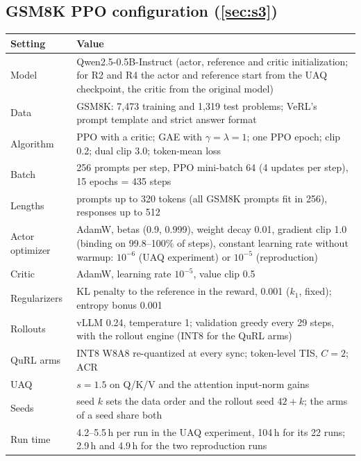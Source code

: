 \subsection{GSM8K PPO configuration (\texorpdfstring{\cref{sec:s3}}{Section 6.3})}
\begin{center}\small
\begin{tabularx}{\linewidth}{@{}l L@{}}
\toprule
Setting & Value\\
\midrule
Model & Qwen2.5-0.5B-Instruct (actor, reference and critic initialization; for R2 and R4 the actor and reference start from the UAQ checkpoint, the critic from the original model)\\
Data & GSM8K: 7{,}473 training and 1{,}319 test problems; VeRL's prompt template and strict answer format\\
Algorithm & PPO with a critic; GAE with $\gamma=\lambda=1$; one PPO epoch; clip 0.2; dual clip 3.0; token-mean loss\\
Batch & 256 prompts per step, PPO mini-batch 64 (4 updates per step), 15 epochs = 435 steps\\
Lengths & prompts up to 320 tokens (all GSM8K prompts fit in 256), responses up to 512\\
Actor optimizer & AdamW, betas (0.9, 0.999), weight decay 0.01, gradient clip 1.0 (binding on 99.8--100\% of steps), constant learning rate without warmup: $10^{-6}$ (UAQ experiment) or $10^{-5}$ (reproduction)\\
Critic & AdamW, learning rate $10^{-5}$, value clip 0.5\\
Regularizers & KL penalty to the reference in the reward, 0.001 ($k_1$, fixed); entropy bonus 0.001\\
Rollouts & vLLM 0.24, temperature 1; validation greedy every 29 steps, with the rollout engine (INT8 for the QuRL arms)\\
QuRL arms & INT8 W8A8 re-quantized at every sync; token-level TIS, $C=2$; ACR\\
UAQ & $s=1.5$ on Q/K/V and the attention input-norm gains\\
Seeds & seed $k$ sets the data order and the rollout seed $42+k$; the arms of a seed share both\\
Run time & 4.2--5.5\,h per run in the UAQ experiment, 104\,h for its 22 runs; 2.9\,h and 4.9\,h for the two reproduction runs\\
\bottomrule
\end{tabularx}
\end{center}

